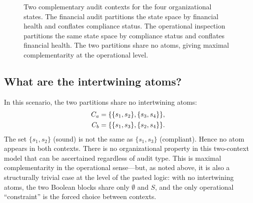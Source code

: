 \documentclass{article}
\begin{document}
\begin{figure}[t]
\centering
{}
\caption{Two complementary audit contexts for the four organizational
states. The financial audit partitions the state space by financial
health and conflates compliance status. The operational inspection
partitions the same state space by compliance status and conflates
financial health. The two partitions share no atoms, giving maximal
complementarity at the operational level.}
\label{fig:org_grid}
\end{figure}

\subsection{What are the intertwining atoms?}

In this scenario, the two partitions share no intertwining atoms:
\begin{align}
C_a &= \{\{s_1,s_2\},\{s_3,s_4\}\},
\notag\\
C_b &= \{\{s_1,s_3\},\{s_2,s_4\}\}.
\label{eq:org}
\end{align}
The set $\{s_1,s_2\}$ (sound) is not the same as
$\{s_1,s_3\}$ (compliant). Hence no atom appears in both contexts.
There is no organizational property in this two-context model that
can be ascertained regardless of audit type. This is maximal
complementarity in the operational sense---but, as noted above, it
is also a structurally trivial case at the level of the pasted
logic: with no intertwining atoms, the two Boolean blocks share only
$\emptyset$ and $S$, and the only operational ``constraint'' is the
forced choice between contexts.
\end{document}
